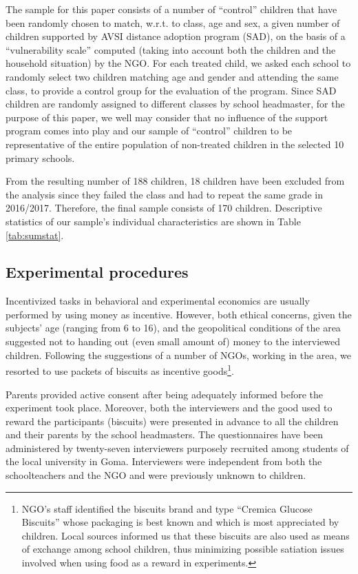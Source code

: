 \documentclass[authoryear, preprint, review, 12pt]{elsarticle}
\begin{document}
The sample for this paper consists of a number of \enquote{control} children that have been randomly chosen to match, w.r.t. to class, age and sex, a given number of children supported by AVSI distance adoption program (SAD), on the basis of a \enquote{vulnerability scale} computed (taking into account both the children and the household situation) by the NGO.
For each treated child, we asked each school to randomly select two children matching age and gender and attending the same class, to provide a control group for the evaluation of the program. Since SAD children are randomly assigned to different classes by school headmaster, for the purpose of this paper, we well may consider that no influence of the support program comes into play and our sample of \enquote{control} children to be representative of the entire population of non-treated children in the selected 10 primary schools. 

From the resulting number of 188 children, 18 children have been excluded from the analysis since they failed the class and had to repeat the same grade in 2016/2017. Therefore, the final sample consists of 170 children. Descriptive statistics of our sample's individual characteristics are shown in Table \ref{tab:sumstat}. 

\subsection{Experimental procedures}
\label{subsec:ExpProc}
Incentivized tasks in behavioral and experimental economics are usually performed by using money as incentive. However, both ethical concerns, given the subjects' age (ranging from 6 to 16), and the geopolitical conditions of the area suggested not to handing out (even small amount of) money to the interviewed children. Following the suggestions of a number of NGOs, working in the area, we resorted to use packets of biscuits as incentive goods\footnote{NGO's staff identified the biscuits brand and type \enquote{Cremica Glucose Biscuits} whose packaging is best known and which is most appreciated by children. Local sources informed us that these biscuits are also used as means of exchange among school children, thus minimizing possible satiation issues involved when using food as a reward in experiments.}. 

Parents provided active consent after being adequately informed before the experiment took place. Moreover, both the interviewers and the good used to reward the participants (biscuits) were presented in advance to all the children and their parents by the school headmasters. The questionnaires have been administered by twenty-seven interviewers purposely recruited among students of the local university in Goma. Interviewers were independent from both the schoolteachers and the NGO and were previously unknown to children.
\end{document}
